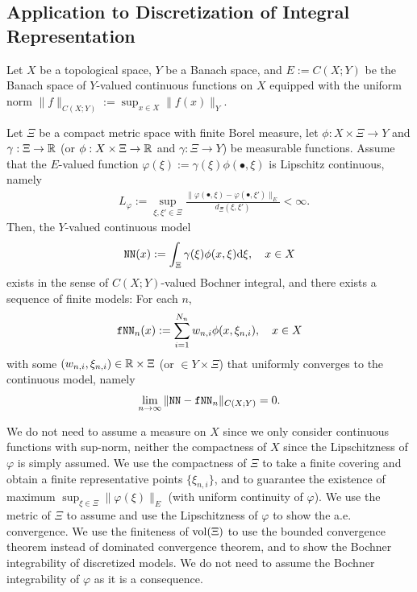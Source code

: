 \subsection{Application to Discretization of Integral Representation}
\begin{theorem} \label{thm:uniform.discretization}
Let $X$ be a topological space,
$Y$ be a Banach space, and $E := C(X;Y)$ be the Banach space of $Y$-valued continuous functions on $X$ equipped with the uniform norm $\| f \|_{C(X;Y)} := \sup_{x \in X} \| f(x) \|_Y$.

Let $\Xi$ be a compact metric space with finite Borel measure, %
let $\phi : X \times \Xi \to Y$ and $\gamma : \Xi \to \mathbb{R}$ (or $\phi : X \times \Xi \to \mathbb{R}$ and $\gamma : \Xi \to Y$) be measurable functions.
Assume that the $E$-valued function $\varphi(\xi) := \gamma(\xi)\phi(\bullet,\xi)$ is 
Lipschitz continuous, namely
\begin{align*}
    &L_{\varphi} := \sup_{\xi,\xi' \in \Xi} \frac{\| \varphi(\bullet,\xi) - \varphi(\bullet,\xi')\|_{E}}{d_\Xi(\xi,\xi')} < \infty.
\end{align*}
Then, the $Y$-valued continuous model
\begin{align*}
    \mathtt{NN}(x) := \int_\Xi \gamma(\xi)\phi(x,\xi)\mathrm{d}\xi, \quad x \in X
\end{align*}
exists in the sense of $C(X;Y)$-valued Bochner integral, and
there exists a sequence of finite models:
For each $n$,
\begin{align*}
\mathtt{fNN}_n(x) := \sum_{i=1}^{N_n} w_{n,i}\phi(x,\xi_{n,i}), \quad x \in X
\end{align*}
with some $(w_{n,i},\xi_{n,i}) \in \mathbb{R} \times \Xi$ (or $\in Y \times \Xi$)
that uniformly converges to the continuous model, namely
\begin{align*}
    \lim_{n \to \infty} \| \mathtt{NN} - \mathtt{fNN}_n \|_{C(X;Y)} = 0.
\end{align*}

\begin{remark}
We do not need to assume a measure on $X$ since we only consider continuous functions with sup-norm, neither the compactness of $X$ since the Lipschitzness of $\varphi$ is simply assumed.
We use the compactness of $\Xi$ to take a finite covering and obtain a finite representative points $\{ \xi_{n,i} \}$,
and to guarantee the existence of maximum $\sup_{\xi \in \Xi}\|\varphi(\xi)\|_E$ (with uniform continuity of $\varphi$).
We use the metric of $\Xi$ to assume and use the Lipschitzness of $\varphi$ to show the a.e. convergence.
We use the finiteness of $\operatorname{vol}(\Xi)$ to use the bounded convergence theorem instead of dominated convergence theorem,
and to show the Bochner integrability of discretized models.
We do not need to assume the Bochner integrability of $\varphi$ as it is a consequence.
\end{remark}

\end{theorem}

